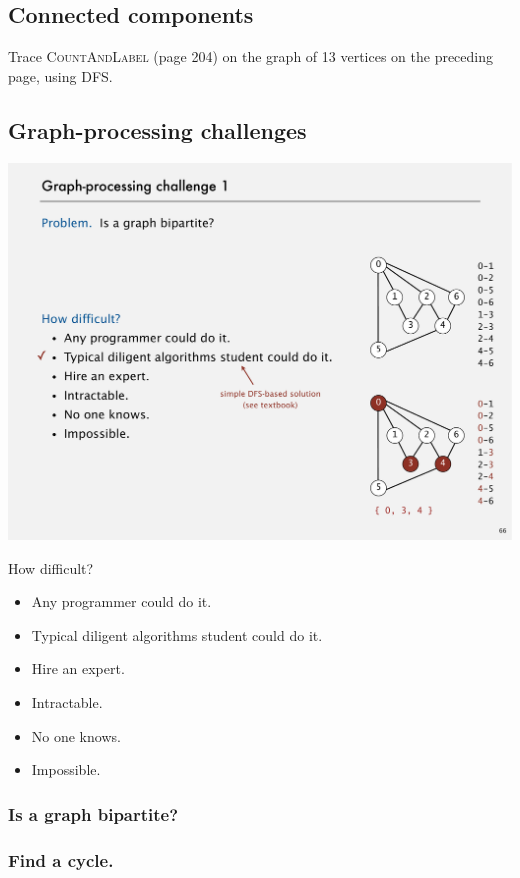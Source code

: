 \documentclass[12pt]{article}
\begin{document}
\subsection{Connected components}

Trace \textsc{CountAndLabel} (page 204) on the graph of 13 vertices on the preceding page, using DFS.



\subsection{Graph-processing challenges}

\includegraphics{w07-graph2.pdf}

How difficult?
\begin{itemize}
    \item Any programmer could do it.
    \item Typical diligent algorithms student could do it.
    \item Hire an expert.
    \item Intractable.
    \item No one knows.
    \item Impossible.
\end{itemize}

\subsubsection{Is a graph bipartite?}
\subsubsection{Find a cycle.}
\end{document}
